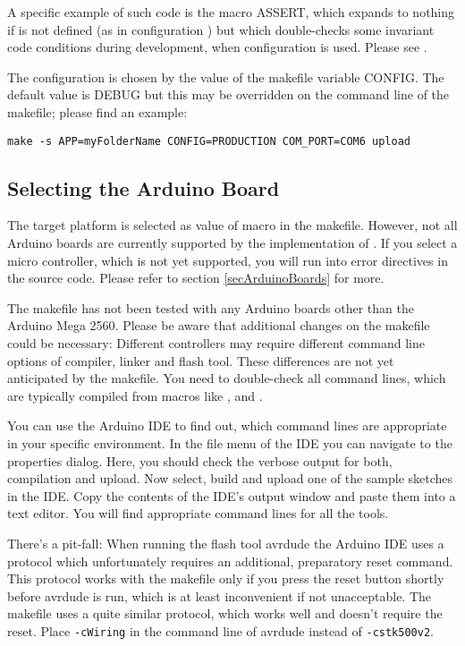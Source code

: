A specific example of such code is the macro ASSERT, which expands to
nothing if  is not defined (as in configuration
) but which double-checks some invariant code conditions
during development, when configuration  is used. Please see
.

The configuration is chosen by the value of the makefile variable CONFIG.
The default value is DEBUG but this may be overridden on the command line
of the makefile; please find an example:

\verb+make -s APP=myFolderName CONFIG=PRODUCTION COM_PORT=COM6 upload+


\subsection{Selecting the Arduino Board}
\label{secMakefileSelectBoard}

The target platform is selected as value of macro
 in the makefile. However, not all Arduino
boards are currently supported by the implementation of \rtos{}. If you
select a micro controller, which is not yet supported, you will run into error
directives in the source code. Please refer to section
\ref{secArduinoBoards} for more.

The makefile has not been tested with any Arduino boards other than the
Arduino Mega 2560. Please be aware that additional changes on the
makefile could be necessary: Different controllers may require different
command line options of compiler, linker and flash tool. These differences
are not yet anticipated by the makefile. You need to double-check all
command lines, which are typically compiled from macros like
,  and .

You can use the Arduino IDE to find out, which command lines are
appropriate in your specific environment. In the file menu of the IDE you
can navigate to the properties dialog. Here, you should check the verbose
output for both, compilation and upload. Now select, build and upload
one of the sample sketches in the IDE. Copy the contents of the IDE's
output window and paste them into a text editor. You will find appropriate
command lines for all the tools.

There's a pit-fall: When running the flash tool avrdude the Arduino IDE
uses a protocol which unfortunately requires an additional, preparatory
reset command. This protocol works with the makefile only if you press the
reset button shortly before avrdude is run, which is at least inconvenient
if not unacceptable. The makefile uses a quite similar protocol, which
works well and doesn't require the reset. Place \verb+-cWiring+ in the
command line of avrdude instead of \verb+-cstk500v2+.



